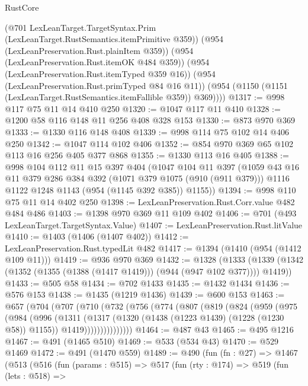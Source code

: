\begin{lexlean}{RustCore}
\begin{coremodule}
        (@701 LexLeanTarget.TargetSyntax.Prim (LexLeanTarget.RustSemantics.itemPrimitive @359))
        (@954 (LexLeanPreservation.Rust.plainItem @359))
        (@954 (LexLeanPreservation.Rust.itemOK @484 @359))
        (@954 (LexLeanPreservation.Rust.itemTyped @359 @16))
        (@954 (LexLeanPreservation.Rust.primTyped @84 @16 @11))
        (@954 (@1150 (@1151 (LexLeanTarget.RustSemantics.itemFallible @359)) @369))))
@1317 := @998 @117 @75 @11 @14 @410 @250
@1320 := @1047 @117 @11 @410
@1328 := @1200 @58 @116 @148 @11 @256 @408 @328 @153
@1330 := @873 @970 @369
@1333 := @1330 @116 @148 @408
@1339 := @998 @114 @75 @102 @14 @406 @250
@1342 := @1047 @114 @102 @406
@1352 := @854 @970 @369 @65 @102 @113 @16 @256 @405 @377 @868
@1355 := @1330 @113 @16 @405
@1388 := @998
    @104
    @112
    @11
    @15
    @397
    @404
    (@1047
      @104
      @11
      @397
      (@1059
        @43
        @16
        @11
        @379
        @286
        @384
        @392
        (@1071 @379 @1075 (@910 (@911 @379)))
        @1116
        @1122
        @1248
        @1143
        (@954 (@1145 @392 @385))
        @1155))
@1394 := @998 @110 @75 @11 @14 @402 @250
@1398 := LexLeanPreservation.Rust.Corr.value @482 @484 @486
@1403 := @1398 @970 @369 @11 @109 @402
@1406 := @701 (@493 LexLeanTarget.TargetSyntax.Value)
@1407 := LexLeanPreservation.Rust.litValue
@1410 := @1403 (@1406 (@1407 @402))
@1412 := LexLeanPreservation.Rust.typedLit @482
@1417 := @1394 (@1410 (@954 (@1412 @109 @11)))
@1419 := @936 @970 @369
@1432 := @1328
    (@1333 (@1339 (@1342 (@1352 (@1355 (@1388 (@1417 @1419))) (@944 (@947 @102 @377)))) @1419))
@1433 := @505 @58
@1434 := @702 @1433
@1435 := @1432 @1434
@1436 := @576 @153
@1438 := @1435 (@1219 @1436)
@1439 := @600 @153
@1463 := @657
    (@704
      (@707
        (@710
          (@732
            (@756
              (@774
                (@807
                  (@819
                    (@824
                      (@959
                        (@975
                          (@984
                            (@996
                              (@1311
                                (@1317
                                  (@1320 (@1438 (@1223 @1439) (@1228 (@1230 @58)) @1155))
                                  @1419)))))))))))))))
@1464 := @487 @43
@1465 := @495 @1216
@1467 := @491 (@1465 @510)
@1469 := @533 (@534 @43)
@1470 := @529 @1469
@1472 := @491 (@1470 @559)
@1489 := @490
    (fun (fn : @27) =>
    @1467
      (@513
        (@516
          (fun (params : @515) =>
          @517
            (fun (rty : @174) =>
            @519
              (fun (lets : @518) =>

\end{coremodule}
\end{lexlean}
